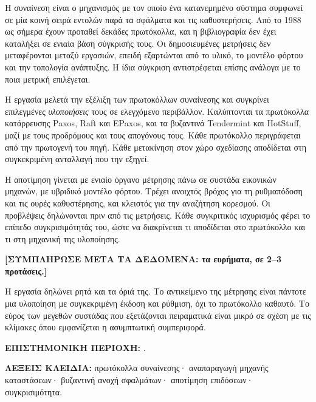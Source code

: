 %
%

Η συναίνεση είναι ο μηχανισμός με τον οποίο ένα κατανεμημένο σύστημα
συμφωνεί σε μία κοινή σειρά εντολών παρά τα σφάλματα και τις
καθυστερήσεις. Από το 1988 ως σήμερα έχουν προταθεί δεκάδες πρωτόκολλα,
και η βιβλιογραφία δεν έχει καταλήξει σε ενιαία βάση σύγκρισής τους. Οι
δημοσιευμένες μετρήσεις δεν μεταφέρονται μεταξύ εργασιών, επειδή
εξαρτώνται από το υλικό, το μοντέλο φόρτου και την τοπολογία ανάπτυξης. Η
ίδια σύγκριση αντιστρέφεται επίσης ανάλογα με το ποια μετρική επιλέγεται.

Η εργασία μελετά την εξέλιξη των πρωτοκόλλων συναίνεσης και συγκρίνει
επιλεγμένες \emph{υλοποιήσεις} τους σε ελεγχόμενο περιβάλλον. Καλύπτονται
τα πρωτόκολλα κατάρρευσης Paxos, Raft και EPaxos, και τα βυζαντινά
Tendermint και HotStuff, μαζί με τους προδρόμους και τους απογόνους τους.
Κάθε πρωτόκολλο περιγράφεται από την πρωτογενή του πηγή. Κάθε μετακίνηση
στον χώρο σχεδίασης αποδίδεται στη συγκεκριμένη ανταλλαγή που την εξηγεί.

Η αποτίμηση γίνεται με ενιαίο όργανο μέτρησης πάνω σε συστάδα εικονικών
μηχανών, με υβριδικό μοντέλο φόρτου. Τρέχει ανοιχτός βρόχος για τη
ρυθμαπόδοση και τις ουρές καθυστέρησης, και κλειστός για την αναζήτηση
κορεσμού. Οι προβλέψεις δηλώνονται πριν από τις μετρήσεις. Κάθε
συγκριτικός ισχυρισμός φέρει το επίπεδο συγκρισιμότητάς του, ώστε να
διακρίνεται τι αποδίδεται στο πρωτόκολλο και τι στη μηχανική της
υλοποίησης.

\textbf{[ΣΥΜΠΛΗΡΩΣΕ ΜΕΤΑ ΤΑ ΔΕΔΟΜΕΝΑ: τα ευρήματα, σε 2--3 προτάσεις.]}

Η εργασία δηλώνει ρητά και τα όριά της. Το αντικείμενο της μέτρησης είναι
πάντοτε μια υλοποίηση με συγκεκριμένη έκδοση και ρύθμιση, όχι το
πρωτόκολλο καθαυτό. Το εύρος των μεγεθών συστάδας που εξετάζονται
πειραματικά είναι μικρό σε σχέση με τις κλίμακες όπου εμφανίζεται η
ασυμπτωτική συμπεριφορά.

\vspace{1.2em}
\noindent\textbf{ΕΠΙΣΤΗΜΟΝΙΚΗ ΠΕΡΙΟΧΗ:} \thScientificAreaEL.

\vspace{0.6em}
\noindent\textbf{ΛΕΞΕΙΣ ΚΛΕΙΔΙΑ:} πρωτόκολλα συναίνεσης· αναπαραγωγή
μηχανής καταστάσεων· βυζαντινή ανοχή σφαλμάτων· αποτίμηση επιδόσεων·
συγκρισιμότητα.
